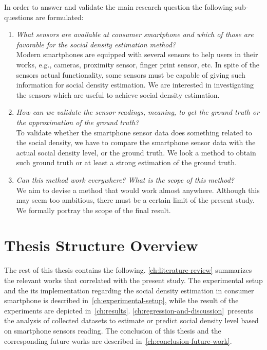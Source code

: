 In order to answer and validate the main research question the following sub-questions are formulated:
\begin{enumerate}
	\item \textit{What sensors are available at consumer smartphone and which of those are favorable for the social density estimation method?}\\
	Modern smartphones are equipped with several sensors to help users in their works, e.g., cameras, proximity sensor, finger print sensor, etc. In spite of the sensors actual functionality, some sensors must be capable of giving such information for social density estimation. We are interested in investigating the sensors which are useful to achieve social density estimation.

	\item \textit{How can we validate the sensor readings, meaning, to get the ground truth or the approximation of the ground truth?}\\
	To validate whether the smartphone sensor data does something related to the social density, we have to compare the smartphone sensor data with the actual social density level, or the ground truth. We look a method to obtain such ground truth or at least a strong estimation of the ground truth.


	\item \textit{Can this method work everywhere? What is the scope of this method?}\\
	We aim to devise a method that would work almost anywhere. Although this may seem too ambitious, there must be a certain limit of the present study. We formally portray the scope of the final result.
\end{enumerate}





\section{Thesis Structure Overview} %
\label{sec:thesis_overview}
The rest of this thesis contains the following.
\autoref{ch:literature-review} summarizes the relevant works that correlated with the present study. The experimental setup and the its implementation regarding the social density estimation in consumer smartphone is described in~\autoref{ch:experimental-setup}, while the result of the experiments are depicted in~\autoref{ch:results}. \autoref{ch:regression-and-discussion}~presents the analysis of collected datasets to estimate or predict social density level based on smartphone sensors reading. The conclusion of this thesis and the corresponding future works are described in~\autoref{ch:conclusion-future-work}.





